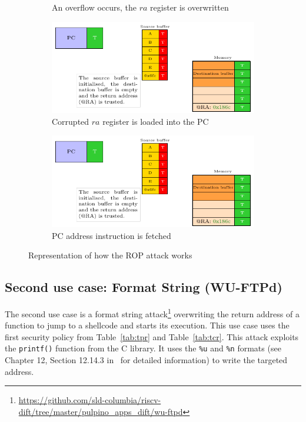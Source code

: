 \begin{figure}[ht]
\begin{subfigure}[b]{0.49\textwidth}
        \caption{An overflow occurs, the $ra$ register is overwritten}
        \label{fig:rop_attack_3}
    \end{subfigure}
    \hfill
    \begin{subfigure}[b]{0.49\textwidth}
        \includegraphics[width=\textwidth, page=4]{c3_vulnerabilities_assessment/img/buffer_overflow/schemaPedagogique.pdf}
        \caption{Corrupted $ra$ register is loaded into the PC}
        \label{fig:rop_attack_4}
    \end{subfigure}
    \hfill
    \begin{subfigure}[b]{0.49\textwidth}
        \includegraphics[width=\textwidth, page=5]{c3_vulnerabilities_assessment/img/buffer_overflow/schemaPedagogique.pdf}
        \caption{PC address instruction is fetched}
        \label{fig:rop_attack_5}
    \end{subfigure}
    \caption{Representation of how the ROP attack works}
    \label{fig:rop_attack}
\end{figure}

\subsection{Second use case: Format String (WU-FTPd)}
The second use case is a format string attack\footnote{\url{https://github.com/sld-columbia/riscv-dift/tree/master/pulpino_apps_dift/wu-ftpd}} overwriting the return address of a function to jump to a shellcode and starts its execution.  This use case uses the first security policy from Table~\ref{tab:tpr} and Table~\ref{tab:tcr}.
This attack exploits the \verb|printf()| function from the C library. It uses the \verb|%u| and \verb|%n| formats (see Chapter 12, Section 12.14.3 in~\cite{gnu_lib_c} for detailed information) to write the targeted address.

